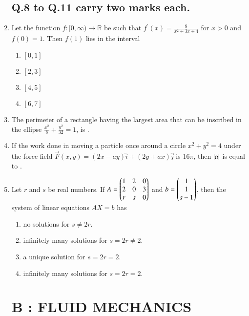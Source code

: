 \documentclass[journal]{IEEEtran}
\begin{document}
\begin{enumerate}
\subsection*{Q.8 to Q.11 carry two marks each.}

    \item Let the function $f:[0,\infty)\to\mathbb{R}$ be such that $f^\prime(x)=\frac{8}{x^2+3x+4}$ for $x>0$ and $f(0)=1$. Then $f(1)$ lies in the interval
        \begin{enumerate}
            \item $[0,1]$
            \item $[2,3]$
            \item $[4,5]$
            \item $[6,7]$
        \end{enumerate}

    \item The perimeter of a rectangle having the largest area that can be inscribed in the ellipse $\frac{x^2}{8}+\frac{y^2}{32}=1$, is \underline{\hspace{1.5cm}}.

    \item If the work done in moving a particle once around a circle $x^2+y^2=4$ under the force field $\vec{F}(x,y)=(2x-ay)\hat{i}+(2y+ax)\hat{j}$ is $16\pi$, then $\left\vert a\right\vert$ is equal to \underline{\hspace{1.5cm}}.

    \item Let $r$ and $s$ be real numbers. If $A = \begin{pmatrix}1&2&0\\2&0&3\\r&s&0\end{pmatrix}$ and $b=\begin{pmatrix}1\\1\\s-1\end{pmatrix}$, then the system of linear equations $AX=b$ has
        \begin{enumerate}
            \item no solutions for $s\neq2r$.
            \item infinitely many solutions for $s=2r\neq2$.
            \item a unique solution for $s=2r=2$.
            \item infinitely many solutions for $s=2r=2$.
        \end{enumerate}

\section*{B : FLUID MECHANICS}


\end{enumerate}
\end{document}
